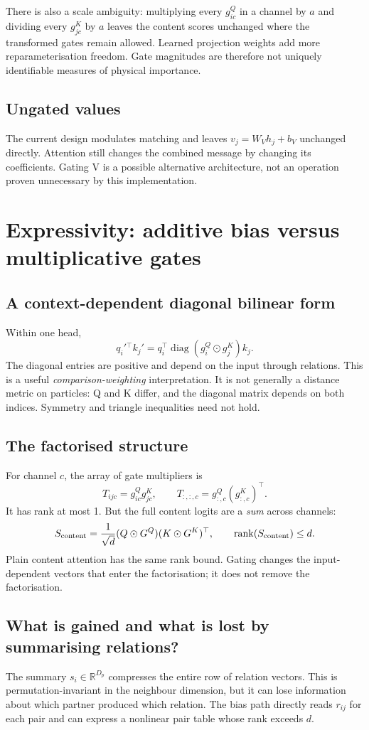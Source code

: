 \documentclass[11pt,a4paper]{article}
\newcommand{\R}{\mathbb R}
\newcommand{\diag}{\operatorname{diag}}
\newcommand{\rank}{\operatorname{rank}}
\newcommand{\Had}{\odot}
\numberwithin{equation}{section}
\begin{document}
There is also a scale ambiguity: multiplying every $g^Q_{ic}$ in a channel
by $a$ and dividing every $g^K_{jc}$ by $a$ leaves the content scores
unchanged where the transformed gates remain allowed. Learned projection
weights add more reparameterisation freedom. Gate magnitudes are therefore
not uniquely identifiable measures of physical importance.

\subsection{Ungated values}
The current design modulates matching and leaves $v_j=W_Vh_j+b_V$
unchanged directly. Attention still changes the combined message by
changing its coefficients. Gating V is a possible alternative architecture,
not an operation proven unnecessary by this implementation.

\section{Expressivity: additive bias versus multiplicative gates}
\subsection{A context-dependent diagonal bilinear form}
Within one head,
\begin{equation}
 q_i'{}^\top k_j'
 =q_i^\top\diag(g_i^Q\Had g_j^K)k_j.
\end{equation}
The diagonal entries are positive and depend on the input through relations.
This is a useful \emph{comparison-weighting} interpretation.
It is not generally a distance metric on particles: Q and K differ, and
the diagonal matrix depends on both indices. Symmetry and triangle
inequalities need not hold.

\subsection{The factorised structure}
For channel $c$, the array of gate multipliers is
\[
 T_{ijc}=g^Q_{ic}g^K_{jc},\qquad
 T_{:,:,c}=g^Q_{:,c}(g^K_{:,c})^\top.
\]
It has rank at most 1. But the full content logits are a \emph{sum} across
channels:
\[
 S_{\rm content}=\frac1{\sqrt d}(Q\Had G^Q)(K\Had G^K)^\top,
 \qquad \rank(S_{\rm content})\le d.
\]
Plain content attention has the same rank bound. Gating changes the
input-dependent vectors that enter the factorisation; it does not remove
the factorisation.

\subsection{What is gained and what is lost by summarising relations?}
The summary $s_i\in\R^{D_p}$ compresses the entire row of relation vectors.
This is permutation-invariant in the neighbour dimension, but it can lose
information about which partner produced which relation.
The bias path directly reads $r_{ij}$ for each pair and can express a
nonlinear pair table whose rank exceeds $d$.
\end{document}
